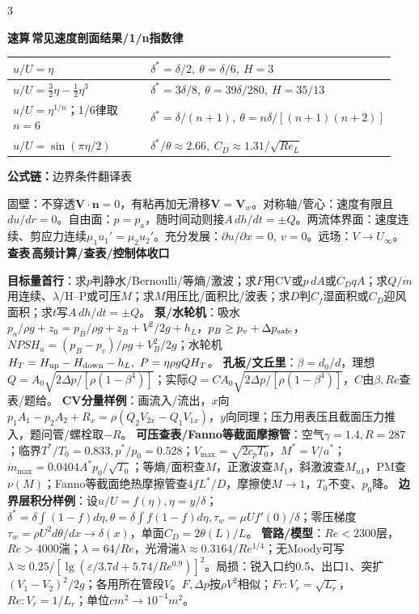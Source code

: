 \documentclass[a4paper]{article}
\newcommand{\form}[1]{{\color{M}\bfseries 公式链：}#1\par}
\newcommand{\labtag}[3]{{\bfseries\color{#1}\colorbox{#1}{\color{white}\fontsize{2.18}{2.28}\selectfont #2}\,#3}\par}
\newcommand{\lookup}[1]{\labtag{C}{查表}{#1}}
\newcommand{\formq}[1]{\form{#1}}
\newcommand{\lookq}[1]{\lookup{#1}}
\newcommand{\quickq}[1]{\labtag{F}{速算}{#1}}
\newenvironment{vfourWrap}{\par\begingroup\fontsize{2.66}{2.80}\selectfont\setlength{\fboxsep}{0.38pt}}{\par\endgroup}
\begin{document}
\begin{multicols}{3}
\begin{vfourWrap}
\quickq{常见速度剖面结果/1/n指数律}
\begin{tabular}{|p{0.42\linewidth}|p{0.52\linewidth}|}\hline
$u/U=\eta$ & $\delta^*=\delta/2,\ \theta=\delta/6,\ H=3$\\\hline
$u/U=\frac32\eta-\frac12\eta^3$ & $\delta^*=3\delta/8,\ \theta=39\delta/280,\ H=35/13$\\\hline
$u/U=\eta^{1/n}$；1/6律取$n=6$ & $\delta^*=\delta/(n+1),\ \theta=n\delta/[(n+1)(n+2)]$\\\hline
$u/U=\sin(\pi\eta/2)$ & $\delta^*/\theta\approx2.66,\ C_D\approx1.31/\sqrt{Re_L}$\\\hline
\end{tabular}
\formq{边界条件翻译表}
固壁：不穿透$\bm V\cdot\bm n=0$，有粘再加无滑移$\bm V=\bm V_w$。对称轴/管心：速度有限且$du/dr=0$。自由面：$p=p_a$，随时间动则接$A\,dh/dt=\pm Q$。两流体界面：速度连续、剪应力连续$\mu_1u_1'=\mu_2u_2'$。充分发展：$\partial u/\partial x=0,\ v=0$。远场：$V\to U_\infty$。
\lookq{高频计算/查表/控制体收口}
{\fontsize{4.35}{4.45}\selectfont
\textbf{目标量首行}：求$p$判静水/Bernoulli/等熵/激波；求$F$用CV或$p\,dA$或$C_DqA$；求$Q/\dot m$用连续、$\lambda$/H--P或可压$M$；求$M$用压比/面积比/波表；求$D$判$C_f$湿面积或$C_D$迎风面积；求$t$写$A\,dh/dt=\pm Q$。 
\textbf{泵/水轮机}：吸水$p_a/\rho g+z_0=p_B/\rho g+z_B+V^2/2g+h_L$，$p_B\ge p_v+\Delta p_{\rm safe}$，$NPSH_a=(p_B-p_v)/\rho g+V_B^2/2g$；水轮机$H_T=H_{\rm up}-H_{\rm down}-h_L,\ P=\eta\rho gQH_T$。 
\textbf{孔板/文丘里}：$\beta=d_0/d$，理想$Q=A_0\sqrt{2\Delta p/[\rho(1-\beta^4)]}$；实际$Q=C A_0\sqrt{2\Delta p/[\rho(1-\beta^4)]}$，$C$由$\beta,Re$查表/题给。 
\textbf{CV分量样例}：画流入/流出，$x$向$p_1A_1-p_2A_2+R_x=\rho(Q_2V_{2x}-Q_1V_{1x})$，$y$向同理；压力用表压且截面压力推入，题问管/螺栓取$-R$。 
\textbf{可压查表/Fanno等截面摩擦管}：空气$\gamma=1.4,R=287$；临界$T^*/T_0=0.833,p^*/p_0=0.528$；$V_{\max}=\sqrt{2c_pT_0}$，$M^*=V/a^*$；$\dot m_{\max}=0.0404A^*p_0/\sqrt{T_0}$；等熵/面积查$M$，正激波查$M_1$，斜激波查$M_{n1}$，PM查$\nu(M)$；Fanno等截面绝热摩擦管查$4fL^*/D$，摩擦使$M\to1$，$T_0$不变、$p_0$降。 
\textbf{边界层积分样例}：设$u/U=f(\eta),\eta=y/\delta$；$\delta^*=\delta\int(1-f)d\eta,\theta=\delta\int f(1-f)d\eta,\tau_w=\mu Uf'(0)/\delta$；零压梯度$\tau_w=\rho U^2d\theta/dx\to\delta(x)$，单面$C_D=2\theta(L)/L$。 
\textbf{管路/模型}：$Re<2300$层，$Re>4000$湍；$\lambda=64/Re$，光滑湍$\lambda\approx0.3164/Re^{1/4}$；无Moody可写$\lambda\approx0.25/[\lg(\varepsilon/3.7d+5.74/Re^{0.9})]^2$。局损：锐入口约0.5、出口1、突扩$(V_1-V_2)^2/2g$；各用所在管段$V$。$F,\Delta p$按$\rho V^2$相似；$Fr:V_r=\sqrt{L_r}$，$Re:V_r=1/L_r$；单位$cm^2\to10^{-4}m^2$。}

\end{vfourWrap}
\end{multicols}
\end{document}
